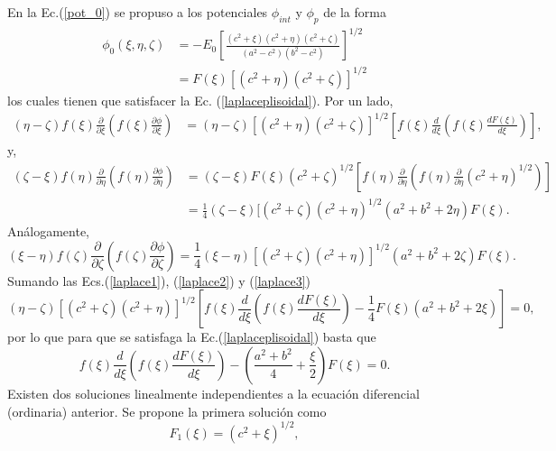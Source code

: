 En la Ec.(\ref{pot_0}) se propuso a los potenciales $\phi_{int}$ y $\phi_p$ de la forma
\begin{align}
    \phi_0(\xi,\eta,\zeta)&=-E_0\left[\frac{(c^2+\xi)(c^2+\eta)(c^2+\zeta)}{(a^2-c^2)(b^2-c^2)}\right]^{1/2}\nonumber\\
    &=F(\xi)[(c^2+\eta)(c^2+\zeta)]^{1/2}
    \label{phi0 con F}
\end{align}
los cuales tienen que satisfacer la Ec. (\ref{laplaceplisoidal}). Por un lado, 
\begin{align}
     (\eta-\zeta)f(\xi)\frac{\partial}{\partial\xi}\left(f(\xi)\frac{\partial\phi}{\partial\xi}\right)&= (\eta-\zeta)[(c^2+\eta)(c^2+\zeta)]^{1/2}\left[f(\xi)\frac{d}{d\xi}\left(f(\xi)\frac{ d F(\xi)}{d\xi}\right)\right],\label{laplace1}
\end{align}
y,
\begin{align}
    (\zeta-\xi)f(\eta)\frac{\partial}{\partial\eta}\left(f(\eta)\frac{\partial\phi}{\partial\eta}\right)&=(\zeta-\xi)F(\xi)(c^2+\zeta)^{1/2}\left[f(\eta)\frac{\partial}{\partial\eta}\left(f(\eta)\frac{\partial}{\partial\eta}(c^2+\eta)^{1/2}\right)\right]\nonumber\\
    &=\frac{1}{4}(\zeta-\xi)[(c^2+\zeta)(c^2+\eta)^{1/2}(a^2+b^2+2\eta)F(\xi).\label{laplace2}
\end{align}
Análogamente,
\begin{equation}
    (\xi-\eta)f(\zeta)\frac{\partial}{\partial\zeta}\left(f(\zeta)\frac{\partial\phi}{\partial\zeta}\right)=\frac{1}{4}(\xi-\eta)[(c^2+\zeta)(c^2+\eta)]^{1/2}(a^2+b^2+2\zeta)F(\xi).\label{laplace3}
\end{equation}
Sumando las Ecs.(\ref{laplace1}), (\ref{laplace2}) y (\ref{laplace3}) 
\begin{equation}
  (\eta-\zeta)[(c^2+\zeta)(c^2+\eta)]^{1/2}\left[f(\xi)\frac{d}{d\xi}\left(f(\xi)\frac{ d F(\xi)}{d\xi}\right)-\frac{1}{4}F(\xi)(a^2+b^2+2\xi)\right]=0,
\end{equation}
por lo que para que se satisfaga la Ec.(\ref{laplaceplisoidal}) basta que
\begin{equation}
    f(\xi)\frac{d}{d\xi}\left(f(\xi)\frac{ d F(\xi)}{d\xi}\right)-\left(\frac{a^2+b^2}{4}+\frac{\xi}{2}\right)F(\xi)=0.
\end{equation}
Existen dos soluciones linealmente independientes a la ecuación diferencial (ordinaria) anterior. Se propone
la primera solución como
\begin{equation}
    F_1(\xi)=(c^2+\xi)^{1/2},
    \label{F1}
\end{equation}
